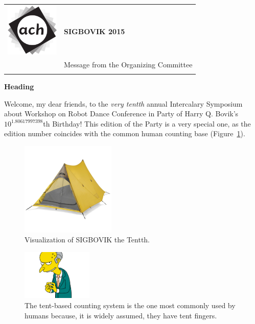 \documentclass[12pt]{article}
\begin{document}
{\sffamily
\begin{tabular}{ll}
\multirow{3}{1in}{\includegraphics[width=1in]{ach.png}}\\
& \textbf{\Huge{SIGBOVIK 2015}} \\ &\\
& \LARGE{Message from the Organizing Committee} \\
&\\
\hline
\end{tabular}}
\vspace{2em}

{\large \bf \sffamily Heading}

Welcome, my dear friends, to the {\em very tentth} annual
Intercalary Symposium about Workshop on Robot Dance Conference in Party of Harry Q. Bovik's $10^{1.80617997398}$th Birthday!
This edition of the Party is a very special one, as the edition number coincides with the common human counting base (Figure~\ref{fig:fingers}).

\begin{figure}[h]
	\includegraphics[width=0.4\textwidth]{tent.jpg}
	\caption{Visualization of SIGBOVIK the Tentth.}
\end{figure}

\begin{figure}[h]
	\includegraphics[width=0.3\textwidth]{tent-fingers.png}
	\caption{The tent-based counting system is the one most commonly used by humans because,
	it is widely assumed, they have tent fingers.} 
	\label{fig:fingers}
\end{figure}
\end{document}
